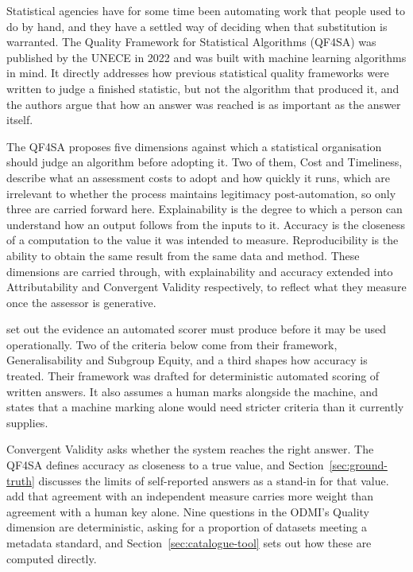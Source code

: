 Statistical agencies have for some time been automating work that people used to do by hand, and they have a settled way of deciding when that substitution is warranted. The Quality Framework for Statistical Algorithms (QF4SA) was published by the UNECE in 2022 \citep{yung2022} and was built with machine learning algorithms in mind. It directly addresses how previous statistical quality frameworks were written to judge a finished statistic, but not the algorithm that produced it, and the authors argue that how an answer was reached is as important as the answer itself.

The QF4SA proposes five dimensions against which a statistical organisation should judge an algorithm before adopting it. Two of them, Cost and Timeliness, describe what an assessment costs to adopt and how quickly it runs, which are irrelevant to whether the process maintains legitimacy post-automation, so only three are carried forward here. Explainability is the degree to which a person can understand how an output follows from the inputs to it. Accuracy is the closeness of a computation to the value it was intended to measure. Reproducibility is the ability to obtain the same result from the same data and method. These dimensions are carried through, with explainability and accuracy extended into Attributability and Convergent Validity respectively, to reflect what they measure once the assessor is generative.

\citet{williamson2012} set out the evidence an automated scorer must produce before it may be used operationally. Two of the criteria below come from their framework, Generalisability and Subgroup Equity, and a third shapes how accuracy is treated. Their framework was drafted for deterministic automated scoring of written answers. It also assumes a human marks alongside the machine, and states that a machine marking alone would need stricter criteria than it currently supplies.

Convergent Validity asks whether the system reaches the right answer. The QF4SA defines accuracy as closeness to a true value, and Section~\ref{sec:ground-truth} discusses the limits of self-reported answers as a stand-in for that value. \citet{williamson2012} add that agreement with an independent measure carries more weight than agreement with a human key alone. Nine questions in the ODMI's Quality dimension are deterministic, asking for a proportion of datasets meeting a metadata standard, and Section~\ref{sec:catalogue-tool} sets out how these are computed directly.


